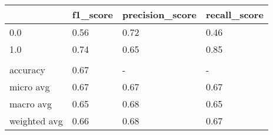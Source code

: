 \begin{tabular}{llll}
\toprule
{} & f1\_score & precision\_score & recall\_score \\
\midrule
0.0          &     0.56 &            0.72 &         0.46 \\
1.0          &     0.74 &            0.65 &         0.85 \\
             &          &                 &              \\
accuracy     &     0.67 &               - &            - \\
micro avg    &     0.67 &            0.67 &         0.67 \\
macro avg    &     0.65 &            0.68 &         0.65 \\
weighted avg &     0.66 &            0.68 &         0.67 \\
\bottomrule
\end{tabular}

